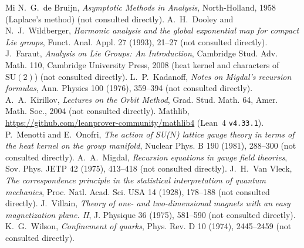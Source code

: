 \documentclass[11pt,a4paper]{article}
\theoremstyle{definition}
\theoremstyle{remark}
\newcommand{\SU}{\mathrm{SU}(2)}
\newcommand{\code}[1]{\texttt{#1}}
\begin{document}
\begin{thebibliography}{Mi}\small\setlength{\itemsep}{0pt}
 N.~G.~de Bruijn, \emph{Asymptotic Methods in Analysis}, North-Holland, 1958 (Laplace's method) (not consulted directly).
 A.~H.~Dooley and N.~J.~Wildberger, \emph{Harmonic analysis and the global exponential map for compact Lie groups}, Funct. Anal. Appl. 27 (1993), 21--27 (not consulted directly).
 J.~Faraut, \emph{Analysis on Lie Groups: An Introduction}, Cambridge Stud. Adv. Math. 110, Cambridge University Press, 2008 (heat kernel and characters of $\SU$) (not consulted directly).
 L.~P.~Kadanoff, \emph{Notes on Migdal's recursion formulas}, Ann. Physics 100 (1976), 359--394 (not consulted directly).
 A.~A.~Kirillov, \emph{Lectures on the Orbit Method}, Grad. Stud. Math. 64, Amer. Math. Soc., 2004 (not consulted directly).
 Mathlib, \url{https://github.com/leanprover-community/mathlib4} (Lean~4 \code{v4.33.1}).
 P.~Menotti and E.~Onofri, \emph{The action of SU($N$) lattice gauge theory in terms of the heat kernel on the group manifold}, Nuclear Phys. B 190 (1981), 288--300 (not consulted directly).
 A.~A.~Migdal, \emph{Recursion equations in gauge field theories}, Sov. Phys. JETP 42 (1975), 413--418 (not consulted directly).
 J.~H.~Van Vleck, \emph{The correspondence principle in the statistical interpretation of quantum mechanics}, Proc. Natl. Acad. Sci. USA 14 (1928), 178--188 (not consulted directly).
 J.~Villain, \emph{Theory of one- and two-dimensional magnets with an easy magnetization plane. II}, J. Physique 36 (1975), 581--590 (not consulted directly).
 K.~G.~Wilson, \emph{Confinement of quarks}, Phys. Rev. D 10 (1974), 2445--2459 (not consulted directly).
\end{thebibliography}
\end{document}
